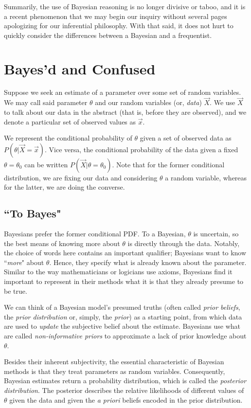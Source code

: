 \documentclass[12pt,twoside]{reedthesis}
\begin{document}
	Summarily, the use of Bayesian reasoning is no longer divisive or taboo, and it is a recent phenomenon that we may begin our inquiry without several pages apologizing for our inferential philosophy. With that said, it does not hurt to quickly consider the differences between a Bayesian and a frequentist. 
		
\section{Bayes'd and Confused}

	Suppose we seek an estimate of a parameter over some set of random variables. We may call said parameter $\theta$ and our random variables (or, {\em data}) $\vec{X}$. We use $\vec{X}$ to talk about our data in the abstract (that is, before they are observed), and we denote a particular set of observed values as $\vec{x}$. 

	We represent the conditional probability of $\theta$ given a set of observed data as $P(\theta | \vec{X} = \vec{x})$. Vice versa, the conditional probability of the data given a fixed $\theta = \theta_0$ can be written $P(\vec{X} | \theta = \theta_0)$. Note that for the former conditional distribution, we are fixing our data and considering $\theta$ a random variable, whereas for the latter, we are doing the converse.

	\subsection*{``To Bayes"}
	Bayesians prefer the former conditional PDF. To a Bayesian, $\theta$ is uncertain, so the best means of knowing more about $\theta$ is directly through the data. Notably, the choice of words here contains an important qualifier; Bayesians want to know ``{\em more}" about $\theta$. Hence, they specify what is already known about the parameter. Similar to the way mathematicians or logicians use axioms, Bayesians find it important to represent in their methods what it is that they already presume to be true.
	
	We can think of a Bayesian model's presumed truths (often called {\em prior beliefs}, the {\em prior distribution} or, simply, the {\em prior}) as a starting point, from which data are used to {\em update} the subjective belief about the estimate.  Bayesians use what are called {\em non-informative priors} to approximate a lack of prior knowledge about $\theta$. 
	
	Besides their inherent subjectivity, the essential characteristic of Bayesian methods is that they treat parameters as random variables. Consequently, Bayesian estimates return a probability distribution, which is called the {\em posterior distribution}. The posterior describes the relative likelihoods of different values of $\theta$ given the data and given the {\em a priori} beliefs encoded in the prior distribution.
\end{document}
